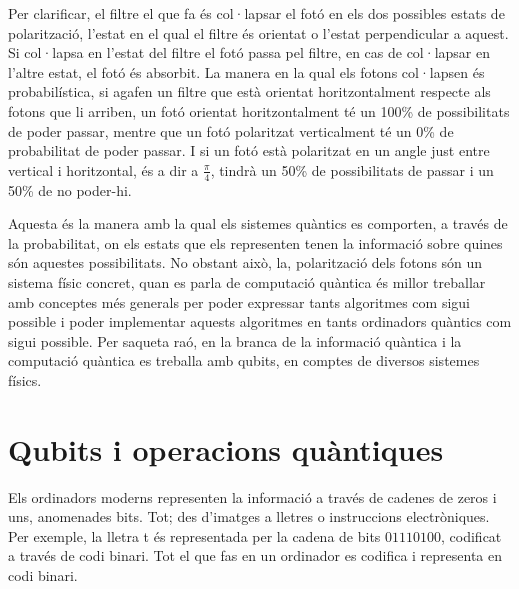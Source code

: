 Per clarificar, el filtre el que fa és col·lapsar el fotó en els dos possibles estats de polarització, l'estat en el qual el filtre és orientat o l'estat perpendicular a aquest. Si col·lapsa en l'estat del filtre el fotó passa pel filtre, en cas de col·lapsar en l'altre estat, el fotó és absorbit. La manera en la qual els fotons col·lapsen és probabilística, si agafen un filtre que està orientat horitzontalment respecte als fotons que li arriben, un fotó orientat horitzontalment té un 100\% de possibilitats de poder passar, mentre que un fotó polaritzat verticalment té un 0\% de probabilitat de poder passar. I si un fotó està polaritzat en un angle just entre vertical i horitzontal, és a dir a $\frac{\pi}{4}$, tindrà un 50\% de possibilitats de passar i un 50\% de no poder-hi.

Aquesta és la manera amb la qual els sistemes quàntics es comporten, a través de la probabilitat, on els estats que els representen tenen la informació sobre quines són aquestes possibilitats.
No obstant això, la, polarització dels fotons són un sistema físic concret, quan es parla de computació quàntica és millor treballar amb conceptes més generals per poder expressar tants algoritmes com sigui possible i poder implementar aquests algoritmes en tants ordinadors quàntics com sigui possible. Per saqueta raó, en la branca de la informació quàntica i la computació quàntica es treballa amb qubits, en comptes de diversos sistemes físics.

\section{Qubits i operacions quàntiques}
Els ordinadors moderns representen la informació a través de cadenes de zeros i uns, anomenades bits. Tot; des d'imatges a lletres o instruccions electròniques. Per exemple, la lletra t és representada per la cadena de bits $01110100$, codificat a través de codi binari. Tot el que fas en un ordinador es codifica i representa en codi binari.

